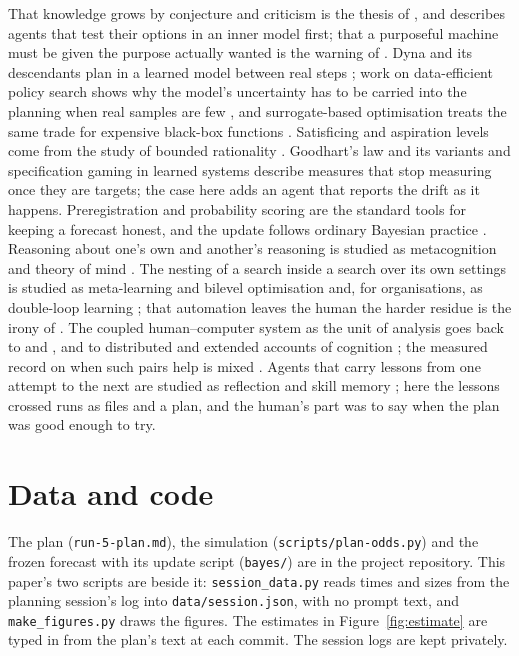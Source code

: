 \documentclass[11pt,a4paper]{article}
\begin{document}
That knowledge grows by conjecture and criticism is the thesis of \citet{popper1963}, and \citet{dennett1995} describes agents that test their options in an inner model first; that a purposeful machine must be given the purpose actually wanted is the warning of \citet{wiener1960}. Dyna and its descendants plan in a learned model between real steps \citep{sutton1991dyna,sutton2018}; work on data-efficient policy search shows why the model's uncertainty has to be carried into the planning when real samples are few \citep{deisenroth2011pilco}, and surrogate-based optimisation treats the same trade for expensive black-box functions \citep{jones1998ego}. Satisficing and aspiration levels come from the study of bounded rationality \citep{simon1956,selten1998}. Goodhart's law and its variants \citep{goodhart1984,manheim2018} and specification gaming in learned systems \citep{krakovna2020} describe measures that stop measuring once they are targets; the case here adds an agent that reports the drift as it happens. Preregistration \citep{nosek2018} and probability scoring \citep{brier1950} are the standard tools for keeping a forecast honest, and the update follows ordinary Bayesian practice \citep{gelman2013bda}. Reasoning about one's own and another's reasoning is studied as metacognition and theory of mind \citep{flavell1979,premack1978}. The nesting of a search inside a search over its own settings is studied as meta-learning and bilevel optimisation \citep{hospedales2022} and, for organisations, as double-loop learning \citep{argyris1977}; that automation leaves the human the harder residue is the irony of \citet{bainbridge1983}. The coupled human--computer system as the unit of analysis goes back to \citet{licklider1960} and \citet{engelbart1962}, and to distributed and extended accounts of cognition \citep{hutchins1995,clark1998}; the measured record on when such pairs help is mixed \citep{vaccaro2024}. Agents that carry lessons from one attempt to the next are studied as reflection and skill memory \citep{shinn2023reflexion,wang2024voyager,wang2024awm}; here the lessons crossed runs as files and a plan, and the human's part was to say when the plan was good enough to try.

\section{Data and code}

The plan (\texttt{run-5-plan.md}), the simulation (\texttt{scripts/plan-odds.py}) and the frozen forecast with its update script (\texttt{bayes/}) are in the project repository. This paper's two scripts are beside it: \texttt{session\_data.py} reads times and sizes from the planning session's log into \texttt{data/session.json}, with no prompt text, and \texttt{make\_figures.py} draws the figures. The estimates in Figure~\ref{fig:estimate} are typed in from the plan's text at each commit. The session logs are kept privately.
\end{document}
